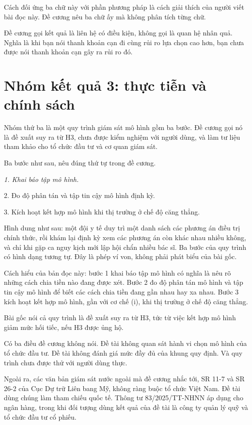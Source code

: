 Cách đối ứng ba chữ này với phần phương pháp là cách giải thích của người viết bài đọc này. Đề cương nêu ba chữ ấy mà không phân tích từng chữ.

Đề cương gọi kết quả là liên hệ có điều kiện, không gọi là quan hệ nhân quả. Nghĩa là khi bạn nói thanh khoản cạn đi cùng rủi ro lựa chọn cao hơn, bạn chưa được nói thanh khoản cạn gây ra rủi ro đó.

\section{Nhóm kết quả 3: thực tiễn và chính sách}

Nhóm thứ ba là một quy trình giám sát mô hình gồm ba bước. Đề cương gọi nó là đề xuất suy ra từ H3, chưa được kiểm nghiệm với người dùng, và làm tư liệu tham khảo cho tổ chức đầu tư và cơ quan giám sát.

Ba bước như sau, nêu đúng thứ tự trong đề cương.

{\itshape 1. Khai báo tập mô hình.

2. Đo độ phân tán và tập tin cậy mô hình định kỳ.

3. Kích hoạt kết hợp mô hình khi thị trường ở chế độ căng thẳng.\par}

Hình dung như sau: một đội y tế duy trì một danh sách các phương án điều trị chính thức, rồi khám lại định kỳ xem các phương án còn khác nhau nhiều không, và chỉ khi gặp ca nguy kịch mới lập hội chẩn nhiều bác sĩ. Ba bước của quy trình có hình dạng tương tự. Đây là phép ví von, không phải phát biểu của bài gốc.

Cách hiểu của bản đọc này: bước 1 khai báo tập mô hình có nghĩa là nêu rõ những cách chia tiền nào đang được xét. Bước 2 đo độ phân tán mô hình và tập tin cậy mô hình để biết các cách chia tiền đang gần nhau hay xa nhau. Bước 3 kích hoạt kết hợp mô hình, gần với cơ chế (i), khi thị trường ở chế độ căng thẳng.

Bài gốc nói cả quy trình là đề xuất suy ra từ H3, tức từ việc kết hợp mô hình giảm mức hối tiếc, nếu H3 được ủng hộ.

Có ba điều đề cương không nói. Đề tài không quan sát hành vi chọn mô hình của tổ chức đầu tư. Đề tài không đánh giá mức đầy đủ của khung quy định. Và quy trình chưa được thử với người dùng thực.

Ngoài ra, các văn bản giám sát nước ngoài mà đề cương nhắc tới, SR 11-7 và SR 26-2 của Cục Dự trữ Liên bang Mỹ, không ràng buộc tổ chức Việt Nam. Đề tài dùng chúng làm tham chiếu quốc tế. Thông tư 83/2025/TT-NHNN áp dụng cho ngân hàng, trong khi đối tượng dùng kết quả của đề tài là công ty quản lý quỹ và tổ chức đầu tư cổ phiếu.

